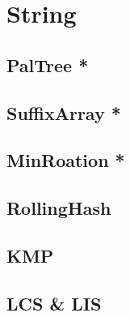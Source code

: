 \documentclass[a4paper,10pt,twocolumn,oneside]{article}
\begin{document}
%

% 

\section{String}

\subsection{PalTree *}


\subsection{SuffixArray *}


\subsection{MinRoation *}


\subsection{RollingHash}


\subsection{KMP}


\subsection{LCS \& LIS}


% 
\end{document}
